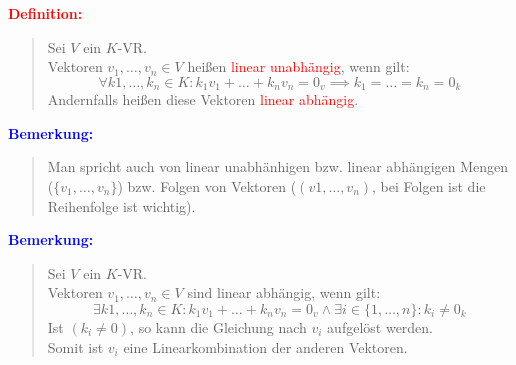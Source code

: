 \documentclass{article}
\newcommand{\red}[1]{\textcolor{red}{#1}}
\newcommand{\blue}[1]{\textcolor{blue}{#1}}
\newcommand{\de}[1]{\red{\textbf{Definition: }}\begin{quote}#1\end{quote}}
\newcommand{\an}[1]{\blue{\textbf{Bemerkung: }}\begin{quote}#1\end{quote}}
\begin{document}
\de{
    Sei $V$ ein $K$-VR.\\
    Vektoren $v_1, \dots, v_n \in V$ heißen \red{linear unabhängig}, wenn gilt:
    \[
        \forall k1, \dots, k_n \in K: k_1v_1 + \dots + k_nv_n = 0_v \implies k_1 = \dots = k_n = 0_k
    \]
    Andernfalls heißen diese Vektoren \red{linear abhängig}.
}

\an{
    Man spricht auch von linear unabhänhigen bzw. linear abhängigen Mengen ($\{v_1, \dots, v_n\}$) bzw. Folgen von Vektoren ($(v1, \dots, v_n)$, bei Folgen ist die Reihenfolge ist wichtig).
}
\an{
    Sei $V$ ein $K$-VR.\\
    Vektoren $v_1, \dots, v_n \in V$ sind linear abhängig, wenn gilt:
    \[
        \exists k1, \dots, k_n \in K: k_1v_1 + \dots + k_nv_n = 0_v \land \exists i \in \{1, \dots, n\}: k_i \neq 0_k
    \]
    Ist $(k_i \neq 0)$, so kann die Gleichung nach $v_i$ aufgelöst werden.\\
    Somit ist $v_i$ eine Linearkombination der anderen Vektoren.
}
\end{document}
